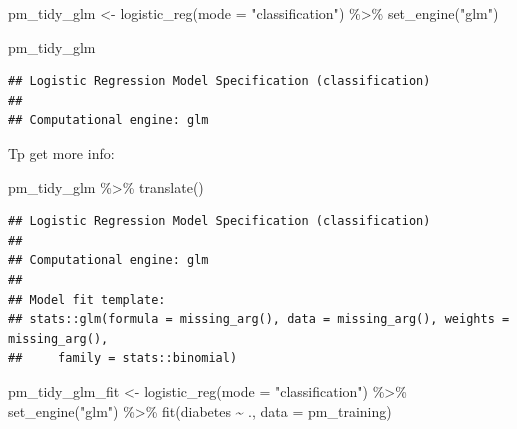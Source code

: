 \documentclass[
]{article}
\newenvironment{Shaded}{\begin{snugshade}}{\end{snugshade}}
\newcommand{\AttributeTok}[1]{\textcolor[rgb]{0.77,0.63,0.00}{#1}}
\newcommand{\FunctionTok}[1]{\textcolor[rgb]{0.00,0.00,0.00}{#1}}
\newcommand{\NormalTok}[1]{#1}
\newcommand{\OtherTok}[1]{\textcolor[rgb]{0.56,0.35,0.01}{#1}}
\newcommand{\SpecialCharTok}[1]{\textcolor[rgb]{0.00,0.00,0.00}{#1}}
\newcommand{\StringTok}[1]{\textcolor[rgb]{0.31,0.60,0.02}{#1}}
\begin{document}
\begin{Shaded}
\begin{Highlighting}[]
\NormalTok{pm\_tidy\_glm }\OtherTok{\textless{}{-}} \FunctionTok{logistic\_reg}\NormalTok{(}\AttributeTok{mode =} \StringTok{"classification"}\NormalTok{) }\SpecialCharTok{\%\textgreater{}\%}
  \FunctionTok{set\_engine}\NormalTok{(}\StringTok{"glm"}\NormalTok{) }
\end{Highlighting}
\end{Shaded}

\begin{Shaded}
\begin{Highlighting}[]
\NormalTok{pm\_tidy\_glm}
\end{Highlighting}
\end{Shaded}

\begin{verbatim}
## Logistic Regression Model Specification (classification)
## 
## Computational engine: glm
\end{verbatim}

Tp get more info:

\begin{Shaded}
\begin{Highlighting}[]
\NormalTok{pm\_tidy\_glm }\SpecialCharTok{\%\textgreater{}\%} \FunctionTok{translate}\NormalTok{()}
\end{Highlighting}
\end{Shaded}

\begin{verbatim}
## Logistic Regression Model Specification (classification)
## 
## Computational engine: glm 
## 
## Model fit template:
## stats::glm(formula = missing_arg(), data = missing_arg(), weights = missing_arg(), 
##     family = stats::binomial)
\end{verbatim}

\begin{Shaded}
\begin{Highlighting}[]
\NormalTok{pm\_tidy\_glm\_fit }\OtherTok{\textless{}{-}} \FunctionTok{logistic\_reg}\NormalTok{(}\AttributeTok{mode =} \StringTok{"classification"}\NormalTok{) }\SpecialCharTok{\%\textgreater{}\%}
  \FunctionTok{set\_engine}\NormalTok{(}\StringTok{"glm"}\NormalTok{) }\SpecialCharTok{\%\textgreater{}\%}
  \FunctionTok{fit}\NormalTok{(diabetes }\SpecialCharTok{\textasciitilde{}}\NormalTok{ ., }\AttributeTok{data =}\NormalTok{ pm\_training)}
\end{Highlighting}
\end{Shaded}
\end{document}
